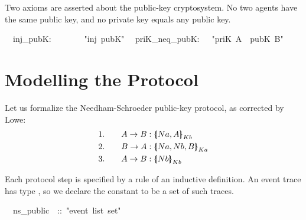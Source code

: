 Two axioms are asserted about the public-key cryptosystem. 
No two agents have the same public key, and no private key equals
any public key.
\begin{isabelle}
\isanewline
\ \ inj_pubK:\ \ \ \ \ \ \ \ "inj\ pubK"\isanewline
\ \ priK_neq_pubK:\ \ \ "priK\ A\ \isasymnoteq\ pubK\ B"
\end{isabelle}





\section{Modelling the Protocol}\label{sec:modelling}

Let us formalize the Needham-Schroeder public-key protocol, as corrected by
Lowe:
\begin{alignat*}{2}
  &1.&\quad  A\to B  &: \mathopen{\{\kern-.30em|} Na,A\mathclose{|\kern-.32em\}}\sb{Kb} \\
  &2.&\quad  B\to A  &: \mathopen{\{\kern-.30em|} Na,Nb,B\mathclose{|\kern-.32em\}}\sb{Ka} \\
  &3.&\quad  A\to B  &: \mathopen{\{\kern-.30em|} Nb\mathclose{|\kern-.32em\}}\sb{Kb}
\end{alignat*}

Each protocol step is specified by a rule of an inductive definition.  An
event trace has type , so we declare the constant
 to be a set of such traces.
\begin{isabelle}
\ \ ns_public\ \ ::\ "event\ list\ set"
\end{isabelle}

